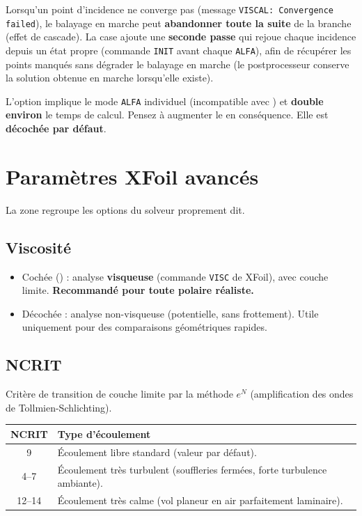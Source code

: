 Lorsqu'un point d'incidence ne converge pas (message
\texttt{VISCAL: Convergence failed}), le balayage en marche peut
\textbf{abandonner toute la suite} de la branche (effet de cascade).
La case  ajoute une \textbf{seconde passe}
qui rejoue chaque incidence depuis un état propre (commande
\texttt{INIT} avant chaque \texttt{ALFA}), afin de récupérer les
points manqués sans dégrader le balayage en marche (le
postprocesseur conserve la solution obtenue en marche lorsqu'elle
existe).

\begin{attention}
L'option  implique le mode \texttt{ALFA}
individuel (incompatible avec ) et \textbf{double
environ} le temps de calcul. Pensez à augmenter le 
en conséquence. Elle est \textbf{décochée par défaut}.
\end{attention}

\section{Paramètres XFoil avancés}

La zone  regroupe les options du solveur
proprement dit.

\subsection{Viscosité}

\begin{itemize}
    \item Cochée () : analyse \textbf{visqueuse}
        (commande \texttt{VISC} de XFoil), avec couche limite.
        \textbf{Recommandé pour toute polaire réaliste.}
    \item Décochée : analyse non-visqueuse (potentielle, sans
        frottement). Utile uniquement pour des comparaisons
        géométriques rapides.
\end{itemize}

\subsection{NCRIT}

Critère de transition de couche limite par la méthode $e^N$
(amplification des ondes de Tollmien-Schlichting).

\begin{tabularx}{\linewidth}{c X}
    \toprule
    \textbf{NCRIT} & \textbf{Type d'écoulement} \\
    \midrule
    9       & Écoulement libre standard (valeur par défaut). \\
    4--7    & Écoulement très turbulent (souffleries fermées,
              forte turbulence ambiante). \\
    12--14  & Écoulement très calme (vol planeur en air
              parfaitement laminaire). \\
    \bottomrule
\end{tabularx}

